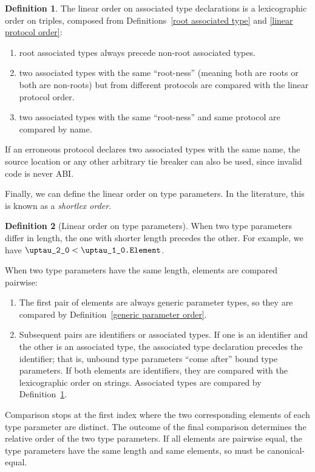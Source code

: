 \documentclass[a4paper,headsepline,bibliography=totoc,toc=flat,fleqn,twoside=semi]{scrbook}
\theoremstyle{definition}
\newtheorem{definition}{Definition}[chapter]
\theoremstyle{definition}
\theoremstyle{definition}
\newcommand{\ttgp}[2]{\texttt{$\uptau$\_#1\_#2}}
\begin{document}
\begin{definition}\label{associated type order}
The linear order on associated type declarations is a lexicographic order on triples, composed from Definitions~\ref{root associated type} and \ref{linear protocol order}:
\begin{enumerate}
\item root associated types always precede non-root associated types.
\item two associated types with the same ``root-ness'' (meaning both are roots or both are non-roots) but from different protocols are compared with the linear protocol order.
\item two associated types with the same ``root-ness'' and same protocol are compared by name.
\end{enumerate}
If an erroneous protocol declares two associated types with the same name, the source location or any other arbitrary tie breaker can also be used, since invalid code is never ABI.
\end{definition}

Finally, we can define the linear order on type parameters. In the literature, this is known as a \emph{shortlex order}.

\begin{definition}[Linear order on type parameters]\label{type parameter order}
When two type parameters differ in length, the one with shorter length precedes the other. For example, we have $\ttgp{2}{0}<\texttt{\ttgp{1}{0}.Element}$.

When two type parameters have the same length, elements are compared pairwise:
\begin{enumerate}
\item The first pair of elements are always generic parameter types, so they are compared by Definition~\ref{generic parameter order}.
\item Subsequent pairs are identifiers or associated types. If one is an identifier and the other is an associated type, the associated type declaration precedes the identifier; that is, unbound type parameters ``come after'' bound type parameters. If both elements are identifiers, they are compared with the lexicographic order on strings. Associated types are compared by Definition~\ref{associated type order}.
\end{enumerate}
Comparison stops at the first index where the two corresponding elements of each type parameter are distinct. The outcome of the final comparison determines the relative order of the two type parameters. If all elements are pairwise equal, the type parameters have the same length and same elements, so must be canonical-equal.
\end{definition}
\end{document}
